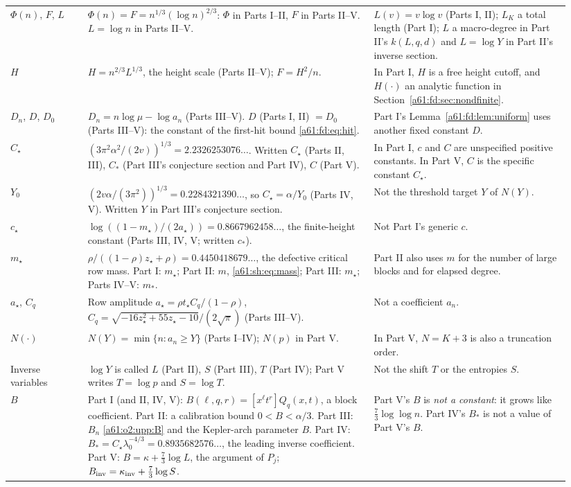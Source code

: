 \documentclass[11pt,letterpaper]{article}
\numberwithin{equation}{section}
\theoremstyle{remark}\newtheorem{remark}[theorem]{Remark}
\newcommand{\st}{\star}
\begin{document}
{\begin{longtable}{@{}>{\raggedright\arraybackslash}p{0.13\linewidth}>{\raggedright\arraybackslash}p{0.48\linewidth}>{\raggedright\arraybackslash}p{0.33\linewidth}@{}}
$\Phi(n)$, $F$, $L$ & $\Phi(n)=F=n^{1/3}(\log n)^{2/3}$: $\Phi$ in Parts I--II, $F$ in Parts II--V. $L=\log n$ in Parts II--V. & $L(v)=v\log v$ (Parts I, II); $L_K$ a total length (Part I); $L$ a macro-degree in Part II's $k(L,q,d)$ and $L=\log Y$ in Part II's inverse section.\\
$H$ & $H=n^{2/3}L^{1/3}$, the height scale (Parts II--V); $F=H^2/n$. & In Part I, $H$ is a free height cutoff, and $H(\cdot)$ an analytic function in Section~\ref{a61:fd:sec:nondfinite}.\\
$D_n$, $D$, $D_0$ & $D_n=n\log\mu-\log a_n$ (Parts III--V). $D$ (Parts I, II) $=D_0$ (Parts III--V): the constant of the first-hit bound \eqref{a61:fd:eq:hit}. & Part I's Lemma~\ref{a61:fd:lem:uniform} uses another fixed constant $D$.\\
$C_\star$ & $(3\pi^2\alpha^2/(2v))^{1/3}=2.2326253076\ldots$. Written $C_\st$ (Parts II, III), $C_*$ (Part III's conjecture section and Part IV), $C$ (Part V). & In Part I, $c$ and $C$ are unspecified positive constants. In Part V, $C$ is the specific constant $C_\star$.\\
$Y_0$ & $(2v\alpha/(3\pi^2))^{1/3}=0.2284321390\ldots$, so $C_\star=\alpha/Y_0$ (Parts IV, V). Written $Y$ in Part III's conjecture section. & Not the threshold target $Y$ of $N(Y)$.\\
$c_\star$ & $\log((1-m_\star)/(2a_\star))=0.8667962458\ldots$, the finite-height constant (Parts III, IV, V; written $c_*$). & Not Part I's generic $c$.\\
$m_\star$ & $\rho/((1-\rho)z_\star+\rho)=0.4450418679\ldots$, the defective critical row mass. Part I: $m_\st$; Part II: $m$, \eqref{a61:sh:eq:mass}; Part III: $m_\st$; Parts IV--V: $m_*$. & Part II also uses $m$ for the number of large blocks and for elapsed degree.\\
$a_\star$, $C_q$ & Row amplitude $a_\star=\rho t_\star C_q/(1-\rho)$, $C_q=\sqrt{-16z_\star^2+55z_\star-10}/(2\sqrt\pi)$ (Parts III--V). & Not a coefficient $a_n$.\\
$N(\cdot)$ & $N(Y)=\min\{n:a_n\ge Y\}$ (Parts I--IV); $N(p)$ in Part V. & In Part V, $N=K+3$ is also a truncation order.\\
Inverse variables & $\log Y$ is called $L$ (Part II), $S$ (Part III), $T$ (Part IV); Part V writes $T=\log p$ and $S=\log T$. & Not the shift $T$ or the entropies $S$.\\
$B$ & Part I (and II, IV, V): $B(\ell,q,r)=[x^\ell t^r]Q_q(x,t)$, a block coefficient. Part II: a calibration bound $0<B<\alpha/3$. Part III: $B_n$ \eqref{a61:o2:upp:B} and the Kepler-arch parameter $B$. Part IV: $B_*=C_\star\lambda_0^{-4/3}=0.8935682576\ldots$, the leading inverse coefficient. Part V: $B=\kappa+\frac73\log L$, the argument of $P_j$; $B_{\rm inv}=\kappa_{\rm inv}+\frac73\log S$. & Part V's $B$ is \emph{not a constant}: it grows like $\frac73\log\log n$. Part IV's $B_*$ is not a value of Part V's $B$.\\

\end{longtable}}
\end{document}
